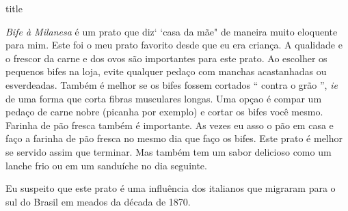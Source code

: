 \documentclass [11pt, letterpaper] {article}
\begin{document}
 {title}

{\em Bife \`a Milanesa} é um prato que diz` `casa da m\~ae" de maneira muito eloquente para mim. Este foi o meu prato favorito desde que eu era criança. A qualidade e o frescor da carne e dos ovos são importantes para este prato. Ao escolher os pequenos bifes na loja, evite qualquer peda\c{c}o com manchas acastanhadas ou esverdeadas. Também é melhor se os bifes fossem cortados `` contra o grão '', {\em ie} de uma forma que corta fibras musculares longas. Uma op\c{c}ao \'e compar um peda\c{c}o de carne nobre (picanha por exemplo) e cortar os bifes voc\^e mesmo. Farinha de p\~ao fresca tamb\'em \'e importante. As vezes eu asso o p\~ao em casa e fa\c{c}o a farinha de p\~ao fresca no mesmo dia que fa\c{c}o os bifes. Este prato é melhor se servido assim que terminar. Mas também tem um sabor delicioso como um lanche frio ou em um sanduíche no dia seguinte. 

Eu suspeito que este prato é uma influência dos italianos que migraram para o sul do Brasil em meados da década de 1870.

\vspace {.3in}
\end{document}
